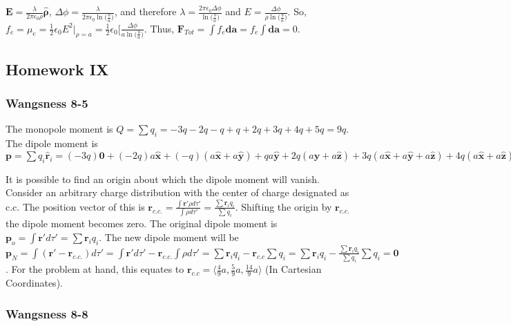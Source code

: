 \documentclass[oneside]{book}
\theoremstyle{definition}
\newcommand*\B[1]{\mathbf{#1}}
\newcommand*\Bh[1]{\mathbf{\hat{#1}}}
\begin{document}
$\B{E} = \frac{\lambda}{2\pi \epsilon_0 \rho}\Bh{\rho}$, $\Delta\phi = \frac{\lambda}{2\pi \epsilon_0 \ln\big(\frac{b}{a}\big)}$, and therefore $\lambda = \frac{2\pi \epsilon_0 \Delta\phi}{\ln\big(\frac{b}{a}\big)}$ and $E = \frac{\Delta \phi}{\rho \ln\big(\frac{b}{a}\big)}$. So, $f_e = \mu_e = \frac{1}{2} \epsilon_0 E^2\bigg|_{\rho = a} = \frac{1}{2} \epsilon_0 \bigg[ \frac{\Delta\phi}{a \ln\big(\frac{b}{a}\big)}$. Thus, $\B{F}_{Tot} = \int f_e \B{da} = f_e \int \B{da} = 0$.



\subsection*{Homework IX}

\subsubsection{Wangsness 8-5}

The monopole moment is $Q = \sum q_i = -3q-2q-q+q+2q+3q+4q+5q=9q$.
The dipole moment is $\B{p} = \sum q_i \Bh{r}_i = (-3q)\B{0} + (-2q)a\Bh{x} + (-q)(a\Bh{x}+a\Bh{y})+qa\Bh{y} + 2q(a\Bh{y}+a\Bh{z})+3q(a\Bh{x}+a\Bh{y}+a\Bh{z})+4q(a\Bh{x}+a\Bh{z})+5qa\Bh{z}=4qa\Bh{x}+5qa\Bh{y}+14aq\Bh{z}$

\begin{figure}[!h]
  \centering
\end{figure}

It is possible to find an origin about which the dipole moment will vanish. Consider an arbitrary charge distribution with the center of charge designated as c.c. The position vector of this is $\B{r}_{c.c.} = \frac{\int \B{r}' \rho d\tau '}{\int \rho d\tau '} = \frac{\sum \B{r}_i q_i}{\sum q_i}$. Shifting the origin by $\B{r}_{c.c.}$ the dipole moment becomes zero. The original dipole moment is $\B{p}_{o} = \int \B{r}' d\tau ' = \sum \B{r}_i q_i$. The new dipole moment will be $\B{p}_N = \int (\B{r}' - \B{r}_{c.c.})d\tau' = \int \B{r}' d\tau' - \B{r}_{c.c.} \int \rho d\tau' = \sum \B{r}_i q_i - \B{r}_{c.c} \sum q_i = \sum \B{r}_i q_i - \frac{\sum \B{r}_i q_i }{\sum q_i}\sum q_i = \B{0}$. For the problem at hand, this equates to $\B{r}_{c.c} = \langle \frac{4}{9}a, \frac{5}{9}a, \frac{14}{9}a\rangle$ (In Cartesian Coordinates).

\subsubsection{Wangsness 8-8}
\end{document}
